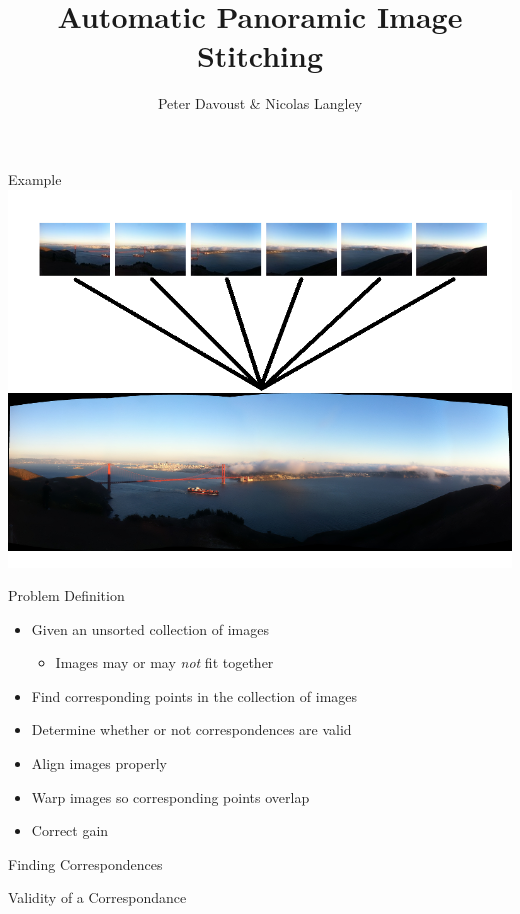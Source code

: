 \documentclass{beamer}
\author{Peter Davoust \& Nicolas Langley}
\title{Automatic Panoramic Image Stitching}
\begin{document}
\begin{frame}[plain]
	\titlepage
\end{frame}

\begin{frame}{Example}
	\includegraphics[width=\textwidth]{StitchExample.png}
\end{frame}

\begin{frame}{Problem Definition}
	\begin{itemize}
		\item Given an unsorted collection of images
		\begin{itemize}
			\item Images may or may \emph{not} fit together
		\end{itemize}
		\item Find corresponding points in the collection of images
		\item Determine whether or not correspondences are valid
		\item Align images properly
		\item Warp images so corresponding points overlap
		\item Correct gain
	\end{itemize}
\end{frame}

\begin{frame}{Finding Correspondences}

\end{frame}

\begin{frame}{Validity of a Correspondance}

\end{frame}
\end{document}

